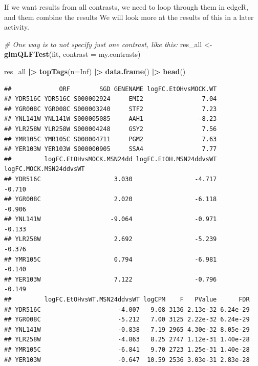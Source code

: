 \documentclass[
]{book}
\newenvironment{Shaded}{\begin{snugshade}}{\end{snugshade}}
\newcommand{\AttributeTok}[1]{\textcolor[rgb]{0.13,0.29,0.53}{#1}}
\newcommand{\CommentTok}[1]{\textcolor[rgb]{0.56,0.35,0.01}{\textit{#1}}}
\newcommand{\ConstantTok}[1]{\textcolor[rgb]{0.56,0.35,0.01}{#1}}
\newcommand{\FunctionTok}[1]{\textcolor[rgb]{0.13,0.29,0.53}{\textbf{#1}}}
\newcommand{\NormalTok}[1]{#1}
\newcommand{\OtherTok}[1]{\textcolor[rgb]{0.56,0.35,0.01}{#1}}
\newcommand{\SpecialCharTok}[1]{\textcolor[rgb]{0.81,0.36,0.00}{\textbf{#1}}}
\begin{document}
If we want results from all contrasts, we need to loop through them in edgeR, and them combine the results We will look more at the results of this in a later activity.

\begin{Shaded}
\begin{Highlighting}[]
\CommentTok{\# One way is to not specify just one contrast, like this:}
\NormalTok{res\_all }\OtherTok{\textless{}{-}} \FunctionTok{glmQLFTest}\NormalTok{(fit, }\AttributeTok{contrast =}\NormalTok{ my.contrasts)}

\NormalTok{res\_all }\SpecialCharTok{|\textgreater{}} 
  \FunctionTok{topTags}\NormalTok{(}\AttributeTok{n=}\ConstantTok{Inf}\NormalTok{) }\SpecialCharTok{|\textgreater{}} 
  \FunctionTok{data.frame}\NormalTok{() }\SpecialCharTok{|\textgreater{}}
  \FunctionTok{head}\NormalTok{()}
\end{Highlighting}
\end{Shaded}

\begin{verbatim}
##             ORF        SGD GENENAME logFC.EtOHvsMOCK.WT
## YDR516C YDR516C S000002924     EMI2                7.04
## YGR008C YGR008C S000003240     STF2                7.23
## YNL141W YNL141W S000005085     AAH1               -8.23
## YLR258W YLR258W S000004248     GSY2                7.56
## YMR105C YMR105C S000004711     PGM2                7.63
## YER103W YER103W S000000905     SSA4                7.77
##         logFC.EtOHvsMOCK.MSN24dd logFC.EtOH.MSN24ddvsWT logFC.MOCK.MSN24ddvsWT
## YDR516C                    3.030                 -4.717                 -0.710
## YGR008C                    2.020                 -6.118                 -0.906
## YNL141W                   -9.064                 -0.971                 -0.133
## YLR258W                    2.692                 -5.239                 -0.376
## YMR105C                    0.794                 -6.981                 -0.140
## YER103W                    7.122                 -0.796                 -0.149
##         logFC.EtOHvsWT.MSN24ddvsWT logCPM    F   PValue      FDR
## YDR516C                     -4.007   9.08 3136 2.13e-32 6.24e-29
## YGR008C                     -5.212   7.00 3125 2.22e-32 6.24e-29
## YNL141W                     -0.838   7.19 2965 4.30e-32 8.05e-29
## YLR258W                     -4.863   8.25 2747 1.12e-31 1.40e-28
## YMR105C                     -6.841   9.70 2723 1.25e-31 1.40e-28
## YER103W                     -0.647  10.59 2536 3.03e-31 2.83e-28
\end{verbatim}
\end{document}

